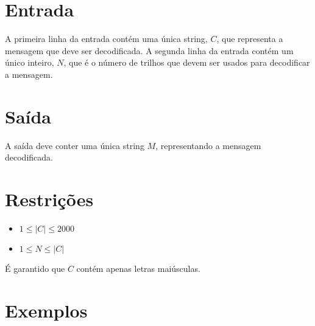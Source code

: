 \section*{Entrada}

A primeira linha da entrada contém uma única string, $C$, que representa a mensagem que deve ser decodificada. 
A segunda linha da entrada contém um único inteiro, $N$, que é o número de trilhos que devem ser usados para decodificar a mensagem.

\section*{Saída}

A saída deve conter uma única string $M$, representando a mensagem decodificada.

\section*{Restrições}

\begin{itemize}
\item $1 \leq |C| \leq 2000$
\item $1 \leq N \leq |C|$
\end{itemize}

É garantido que $C$ contém apenas letras maiúsculas.

\section*{Exemplos}

\exemplo
